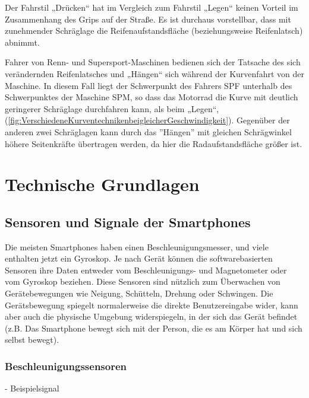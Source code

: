 Der Fahrstil „Drücken“ hat im Vergleich zum Fahrstil „Legen“ keinen Vorteil im Zusammenhang des Grips auf der Straße. Es ist durchaus vorstellbar, dass mit zunehmender Schräglage die Reifenaufstandsfläche (beziehungsweise Reifenlatsch) abnimmt.

Fahrer von Renn- und Supersport-Maschinen bedienen sich der Tatsache des sich verändernden Reifenlatsches und „Hängen“ sich während der Kurvenfahrt von der Maschine. In diesem Fall liegt der Schwerpunkt des Fahrers SPF unterhalb des Schwerpunktes der Maschine SPM, so dass das Motorrad die Kurve mit deutlich geringerer Schräglage durchfahren kann, als beim „Legen“, (\autoref{fig:VerschiedeneKurventechnikenbeigleicherGeschwindigkeit}). Gegenüber der anderen zwei Schräglagen kann durch das ''Hängen'' mit gleichen Schrägwinkel höhere Seitenkräfte übertragen werden, da hier die Radaufstandsfläche größer ist.


%
%
%
%
\section{Technische Grundlagen} \label{Technik}



\subsection{Sensoren und Signale der Smartphones}

%
%
%
%
%
Die meisten Smartphones haben einen Beschleunigungsmesser, und viele enthalten jetzt ein Gyroskop. Je nach Gerät können die softwarebasierten Sensoren ihre Daten entweder vom Beschleunigungs- und Magnetometer oder vom Gyroskop beziehen. Diese Sensoren sind nützlich zum Überwachen von Gerätebewegungen wie Neigung, Schütteln, Drehung oder Schwingen. Die Gerätsbewegung spiegelt normalerweise die direkte Benutzereingabe wider, kann aber auch die physische Umgebung widerspiegeln, in der sich das Gerät befindet (z.B. Das Smartphone bewegt sich mit der Person, die es am Körper hat und sich selbst bewegt).\citep{DevelopersMotionSen}



%
%
%
%


\subsubsection{Beschleunigungssensoren}
- Beispielsignal\\

